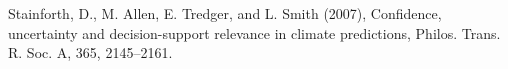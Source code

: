 Stainforth, D., M. Allen, E. Tredger, and L. Smith (2007), Confidence, uncertainty and decision-support relevance in climate predictions,
Philos. Trans. R. Soc. A, 365, 2145–2161.